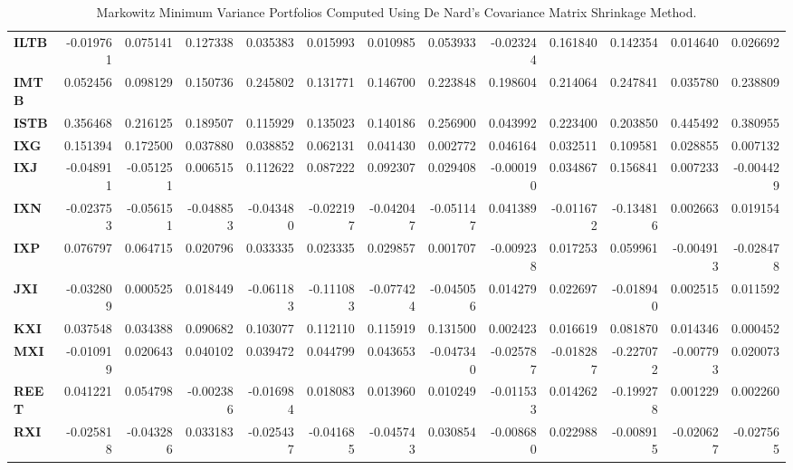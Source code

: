 \begin{table}[h!]
{\begin{tabular}{lrrrrrrrrrrrr}
        \textbf{ILTB} & -0.019761 & 0.075141  & 0.127338  & 0.035383  & 0.015993  & 0.010985  & 0.053933  & -0.023244 & 0.161840  & 0.142354  & 0.014640  & 0.026692  \\
        \textbf{IMTB} & 0.052456  & 0.098129  & 0.150736  & 0.245802  & 0.131771  & 0.146700  & 0.223848  & 0.198604  & 0.214064  & 0.247841  & 0.035780  & 0.238809  \\
        \textbf{ISTB} & 0.356468  & 0.216125  & 0.189507  & 0.115929  & 0.135023  & 0.140186  & 0.256900  & 0.043992  & 0.223400  & 0.203850  & 0.445492  & 0.380955  \\
        \textbf{IXG}  & 0.151394  & 0.172500  & 0.037880  & 0.038852  & 0.062131  & 0.041430  & 0.002772  & 0.046164  & 0.032511  & 0.109581  & 0.028855  & 0.007132  \\
        \textbf{IXJ}  & -0.048911 & -0.051251 & 0.006515  & 0.112622  & 0.087222  & 0.092307  & 0.029408  & -0.000190 & 0.034867  & 0.156841  & 0.007233  & -0.004429 \\
        \textbf{IXN}  & -0.023753 & -0.056151 & -0.048853 & -0.043480 & -0.022197 & -0.042047 & -0.051147 & 0.041389  & -0.011672 & -0.134816 & 0.002663  & 0.019154  \\
        \textbf{IXP}  & 0.076797  & 0.064715  & 0.020796  & 0.033335  & 0.023335  & 0.029857  & 0.001707  & -0.009238 & 0.017253  & 0.059961  & -0.004913 & -0.028478 \\
        \textbf{JXI}  & -0.032809 & 0.000525  & 0.018449  & -0.061183 & -0.111083 & -0.077424 & -0.045056 & 0.014279  & 0.022697  & -0.018940 & 0.002515  & 0.011592  \\
        \textbf{KXI}  & 0.037548  & 0.034388  & 0.090682  & 0.103077  & 0.112110  & 0.115919  & 0.131500  & 0.002423  & 0.016619  & 0.081870  & 0.014346  & 0.000452  \\
        \textbf{MXI}  & -0.010919 & 0.020643  & 0.040102  & 0.039472  & 0.044799  & 0.043653  & -0.047340 & -0.025787 & -0.018287 & -0.227072 & -0.007793 & 0.020073  \\
        \textbf{REET} & 0.041221  & 0.054798  & -0.002386 & -0.016984 & 0.018083  & 0.013960  & 0.010249  & -0.011533 & 0.014262  & -0.199278 & 0.001229  & 0.002260  \\
        \textbf{RXI}  & -0.025818 & -0.043286 & 0.033183  & -0.025437 & -0.041685 & -0.045743 & 0.030854  & -0.008680 & 0.022988  & -0.008915 & -0.020627 & -0.027565
    \end{tabular}}
    \caption{Markowitz Minimum Variance Portfolios Computed Using De Nard's Covariance Matrix Shrinkage Method.}
\end{table}

